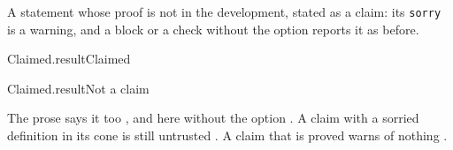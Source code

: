 \documentclass{article}
\begin{document}
A statement whose proof is not in the development, stated as a claim: its
\texttt{sorry} is a warning, and a block or a check without the option
reports it as before.
\begin{leanclaim}[claim]{Claimed.result}{Claimed}
\end{leanclaim}
\begin{leanblock}[view=math]{Claimed.result}{Not a claim}
\end{leanblock}
The prose says it too , and here without the
option .
A claim with a sorried definition in its cone is still untrusted
.
A claim that is proved warns of nothing .
\end{document}
